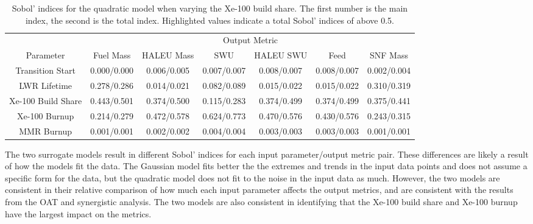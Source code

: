 \begin{table}[h!]
    \centering
    \caption{Sobol' indices for the quadratic model when varying the Xe-100 
    build share. The first number is the main index, the second is the total 
    index. Highlighted 
    values indicate a total Sobol' indices of above 0.5.}
    \label{tab:s7_sobol_xe100_quadratic}
    \begin{tabular}{c c c c c c c}
        \hline
        & \multicolumn{6}{c}{Output Metric} \\
        Parameter & Fuel Mass & HALEU Mass & SWU & HALEU SWU & Feed & SNF Mass \\
        \hline
        Transition Start & 0.000/0.000& 0.006/0.005 & 0.007/0.007 &
                           0.008/0.007 & 0.008/0.007 & 0.002/0.004\\
        LWR Lifetime & 0.278/0.286 & 0.014/0.021 & 0.082/0.089 & 
                       0.015/0.022 & 0.015/0.022 & 0.310/0.319\\
        Xe-100 Build Share & \cellcolor{green!25}0.443/0.501 & \cellcolor{green!25}0.374/0.500 & 0.115/0.283 & 
                             0.374/0.499 & 0.374/0.499 & 0.375/0.441\\
        Xe-100 Burnup & 0.214/0.279 & \cellcolor{green!25}0.472/0.578 & \cellcolor{green!25}0.624/0.773 &
                        \cellcolor{green!25}0.470/0.576 & \cellcolor{green!25}0.430/0.576 & 0.243/0.315\\
        MMR Burnup & 0.001/0.001 & 0.002/0.002 & 0.004/0.004 &
                     0.003/0.003 & 0.003/0.003 & 0.001/0.001\\
        \hline        
    \end{tabular}
\end{table}

The two surrogate models result in different Sobol' indices for each 
input parameter/output metric pair. These differences are likely a result 
of how the models fit the data. The Gaussian model fits 
better the the extremes and trends in the input data points and does not 
assume a specific form for the data, but the 
quadratic model does not fit to the noise in the input data as much. 
However, the two models are consistent in 
their relative comparison of how much each input parameter affects the output 
metrics, and are consistent with the results from the \gls{OAT} and 
synergistic analysis. The two models are also consistent in 
identifying that the Xe-100 build share and Xe-100 burnup 
have the largest impact on the metrics.

